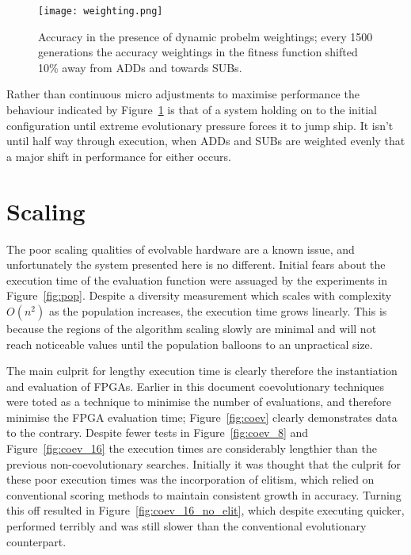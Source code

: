 \begin{figure}
	\centering
	\texttt{[image: weighting.png]}
	\caption[Accuracy in the presence of dynamic problem weightings]
	{Accuracy in the presence of dynamic probelm weightings;
		every 1500 generations the accuracy weightings in the fitness
	function shifted 10\% away from ADDs and towards SUBs.}
	\label{fig:weight}
\end{figure}

Rather than continuous micro adjustments to maximise performance the behaviour
indicated by Figure~\ref{fig:weight} is that of a system holding on to the
initial configuration until extreme evolutionary pressure forces it to jump
ship. It isn't until half way through execution, when ADDs and SUBs are weighted
evenly that a major shift in performance for either occurs.

\section{Scaling \label{s:scaling}}

The poor scaling qualities of evolvable hardware are a known issue, and
unfortunately the system presented here is no different. Initial fears
about the execution time of the evaluation function were assuaged by
the experiments in Figure~\ref{fig:pop}. Despite a diversity measurement
which scales with complexity $O(n^2)$ as the population increases, the
execution time grows linearly. This is because the regions of the algorithm
scaling slowly are minimal and will not reach noticeable values until the
population balloons to an unpractical size.

The main culprit for lengthy execution time is clearly therefore the
instantiation and evaluation of FPGAs. Earlier in this document coevolutionary
techniques were toted as a technique to minimise the number of evaluations,
and therefore minimise the FPGA evaluation time; Figure~\ref{fig:coev}
clearly demonstrates data to the contrary. Despite fewer tests in
Figure~\ref{fig:coev_8} and Figure~\ref{fig:coev_16} the execution times
are considerably lengthier than the previous non-coevolutionary searches.
Initially it was thought that the culprit for these poor execution times
was the incorporation of elitism, which relied on conventional scoring
methods to maintain consistent growth in accuracy. Turning this off
resulted in Figure~\ref{fig:coev_16_no_elit}, which despite executing quicker,
performed terribly and was still slower than the conventional evolutionary
counterpart.

